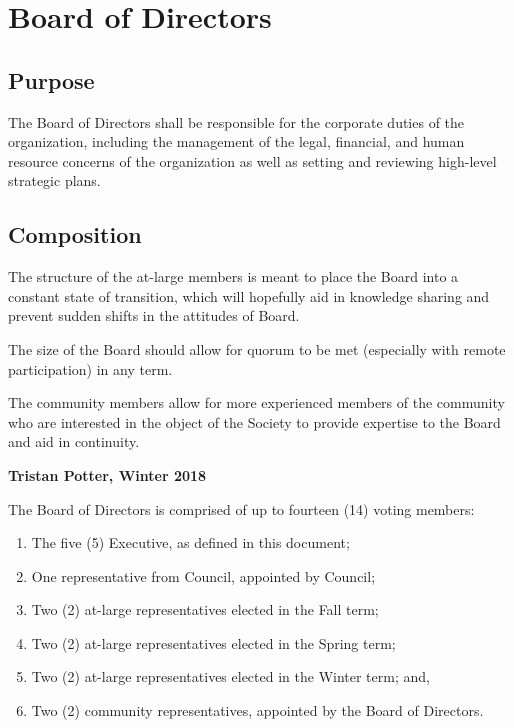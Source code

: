 \section{Board of Directors}
\subsection{Purpose}
The Board of Directors shall be responsible for the corporate duties of the
organization, including the management of the legal, financial, and human
resource concerns of the organization as well as setting and reviewing
high-level strategic plans.

\subsection{Composition}
\begin{annotation}
    The structure of the at-large members is meant to place the Board into
    a constant state of transition, which will hopefully aid in knowledge
    sharing and prevent sudden shifts in the attitudes of Board. 

    The size of the Board should allow for quorum to be met (especially with
    remote participation) in any term. 

    The community members allow for more experienced members of the community
    who are interested in the object of the Society to provide expertise to the
    Board and aid in continuity.

    \textbf{Tristan Potter, Winter 2018}
\end{annotation}

The Board of Directors is comprised of up to fourteen (14) voting members:
\begin{enumerate}
    \item The five (5) Executive, as defined in this document; 
    \item One representative from Council, appointed by Council; 
    \item Two (2) at-large representatives elected in the Fall term;
    \item Two (2) at-large representatives elected in the Spring term;
    \item Two (2) at-large representatives elected in the Winter term; and,
    \item Two (2) community representatives, appointed by the Board of Directors.
\end{enumerate}

